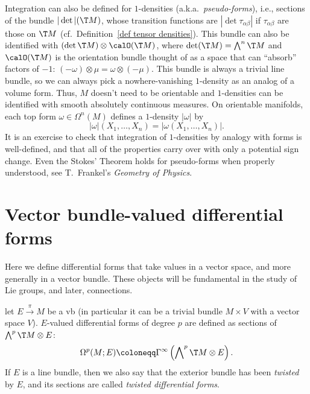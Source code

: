 \begin{rem}
    Integration can also be defined for $1$-densities (a.k.a.~\emph{pseudo-forms}), i.e., sections of the bundle $|\det|(\T M)$, whose transition functions are $|\det\tau_{\alpha\beta}|$ if $\tau_{\alpha\beta}$ are those on $\T M$ (cf.\ Definition~\ref{def tensor densities}). This bundle can also be identified with $(\det \T M)\otimes \calO(\T M)$, where $\det (\T M)=\bigwedge\nolimits^n \T M$ and $\calO(\T M)$ is the orientation bundle thought of as a space that can ``absorb'' factors of $- 1$: $(-\omega)\otimes \mu=\omega\otimes (-\mu)$. This bundle is always a trivial line bundle, so we can always pick a nowhere-vanishing $1$-density as an analog of a volume form. Thus, $M$ doesn't need to be orientable and $1$-densities can be identified with smooth absolutely continuous measures. On orientable manifolds, each top form $\omega\in\Omega^n(M)$ defines a $1$-density $|\omega|$ by 
    \[|\omega|(X_1,\ldots,X_n)=|\omega(X_1,\ldots,X_n)|.\]
    It is an exercise to check that integration of $1$-densities by analogy with forms is well-defined, and that all of the properties carry over with only a potential sign change. Even the Stokes' Theorem holds for pseudo-forms when properly understood, see T.~Frankel's \emph{Geometry of Physics}.
\end{rem}







\section{Vector bundle-valued differential forms}

Here we define differential forms that take values in a vector space, and more generally in a vector bundle. These objects will be fundamental in the study of Lie groups, and later, connections.

\begin{defn}
    let $E\overset\pi\to M$ be a \gls{vb} (in particular it can be a trivial bundle $M\times V$ with a vector space $V$). $E$-valued differential forms of degree $p$ are defined as sections of $\bigwedge\nolimits^p\T M\otimes E$:
    \[\Omega^p(M;E)\coloneqq \Gamma^\infty\left(\bigwedge\nolimits^p \T M\otimes E\right).\]
     If $E$ is a line bundle, then we also say that the exterior bundle has been \emph{twisted} by $E$, and its sections are called \emph{twisted differential forms}.
\end{defn}


